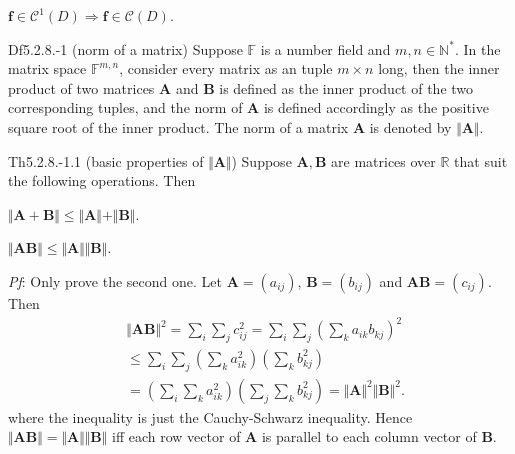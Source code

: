 \documentclass{article}
\begin{document}
\begin{Rmk}{}
    \textcolor{Th}{$\pmb{f}\in\mathcal{C}^1(D) \Rightarrow \pmb{f}\in\mathcal{C}(D)$.}
\end{Rmk}

\begin{Df}{Df5.2.8.-1 (norm of a matrix)}
    Suppose $\mathbb{F}$ is a number field and $m, n\in\mathbb{N}^\ast$. In the matrix space $\mathbb{F}^{m,n}$, consider every matrix as an tuple $m\times n$ long, then the inner product of two matrices $\pmb{A}$ and $\pmb{B}$ is defined as the inner product of the two corresponding tuples, and the norm of $\pmb{A}$ is defined accordingly as the positive square root of the inner product. The norm of a matrix $\pmb{A}$ is denoted by $\Vert \pmb{A}\Vert$.
\end{Df}

\begin{Th}{Th5.2.8.-1.1 (basic properties of $\Vert\pmb{A}\Vert$)}
    Suppose $\pmb{A}, \pmb{B}$ are matrices over $\mathbb{R}$ that suit the following operations. Then
    \begin{compactenum}
        \item $\Vert \pmb{A} + \pmb{B}\Vert \leq \Vert \pmb{A}\Vert + \Vert \pmb{B}\Vert$.
        \item $\Vert \pmb{A}\pmb{B}\Vert \leq \Vert \pmb{A}\Vert\Vert \pmb{B}\Vert$.
    \end{compactenum}
    \tcblower
    \textit{Pf}: Only prove the second one. Let $\pmb{A} = (a_{ij})$, $\pmb{B} = (b_{ij})$ and $\pmb{AB} = (c_{ij})$. Then
    $$ 
    \begin{aligned}
        & \Vert \pmb{AB}\Vert^2 = \sum_i\sum_j c_{ij}^2 = \sum_i\sum_j\left(\sum_k a_{ik}b_{kj}\right)^2 \\
        & \leq \sum_i\sum_j\left(\sum_k a_{ik}^2\right)\left(\sum_k b_{kj}^2\right) \\
        & = \left( \sum_i\sum_k a_{ik}^2 \right)\left( \sum_j\sum_k b_{kj}^2 \right) = \Vert \pmb{A}\Vert^2\Vert \pmb{B}\Vert^2.
    \end{aligned}
    $$
    where the inequality is just the Cauchy-Schwarz inequality. Hence \textcolor{Th}{$\Vert \pmb{AB}\Vert = \Vert \pmb{A}\Vert\Vert \pmb{B}\Vert$ iff each row vector of $\pmb{A}$ is parallel to each column vector of $\pmb{B}$.}
\end{Th}
\end{document}
